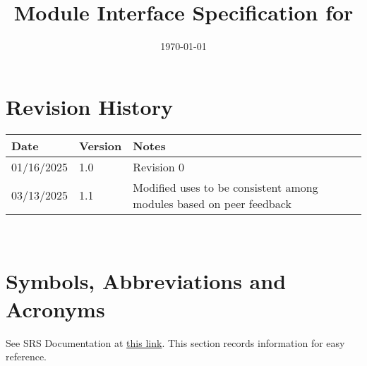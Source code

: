 \documentclass[12pt, titlepage]{article}
\begin{document}
\title{Module Interface Specification for \progname{}}

\author{\authname}

\date{\today}

\maketitle


\section{Revision History}

\begin{tabularx}{\textwidth}{p{3cm}p{2cm}X}
\toprule {\bf Date} & {\bf Version} & {\bf Notes}\\
\midrule
01/16/2025 & 1.0 & Revision 0\\
03/13/2025 & 1.1 & Modified uses to be consistent among modules based on peer feedback\\

\bottomrule
\end{tabularx}

~\newpage

\section{Symbols, Abbreviations and Acronyms}

See SRS Documentation at \href{https://github.com/TPGEngine/tpg/blob/main/docs/SRS/SRS.pdf}{this link}. This section records information for easy reference. \\
\end{document}
